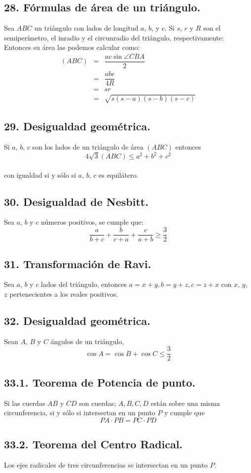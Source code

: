 \documentclass[12pt,a4paper]{article}
\begin{document}
\subsection*{28. Fórmulas de área de un triángulo.}
Sea $ABC$ un triángulo con lados de longitud $a$, $b$, y $c$. Si $s$, $r$ y $R$ son el semiperímetro, el inradio y el circunradio del triángulo, respectivamente: Entonces su área las podemos calcular como:
\begin{eqnarray*}
(ABC)&=& \dfrac{ac \sin \angle CBA}{2}
\\&=& \dfrac{abc}{4R}
\\&=& sr
\\&=& \sqrt{s(s-a)(s-b)(s-c)}
\end{eqnarray*}
\subsection*{29. Desigualdad geométrica.}
Si $a$, $b$, $c$ son los lados de un triángulo de área $(ABC)$ entonces $$4\sqrt{3}(ABC) \leq a^2 + b^2 + c^2$$
\\con igualdad si y sólo si $a$, $b$, $c$ es equilátero.
\subsection*{30. Desigualdad de Nesbitt.}
Sea $a$, $b$ y $c$ números positivos, se cumple que:
$$\dfrac{a}{b+c} + \dfrac{b}{c+a}+ \dfrac{c}{a+b} \geq \dfrac{3}{2}$$
\subsection*{31. Transformación de Ravi.}
Sea $a$, $b$ y $c$ lados del triángulo, entonces $a=x+y, b=y+z, c=z+x$ con $x$, $y$, $z$ pertenecientes a los reales positivos.
\subsection*{32. Desigualdad geométrica.}
Sean $A$, $B$ y $C$ ángulos de un triángulo, $$\cos A =\cos B +\cos C \leq \dfrac{3}{2}$$ 
\subsection*{33.1. Teorema de Potencia de punto.}
Si las cuerdas $AB$ y $CD$ son cuerdas; $A, B, C, D$ están sobre una misma circunferencia, si y sólo si intersectan en un punto $P$ y cumple que $$PA \cdot PB = PC \cdot PD$$
\subsection*{33.2. Teorema del Centro Radical.}
Los ejes radicales de tres circunferencias se intersectan en un punto $P$.
\end{document}
